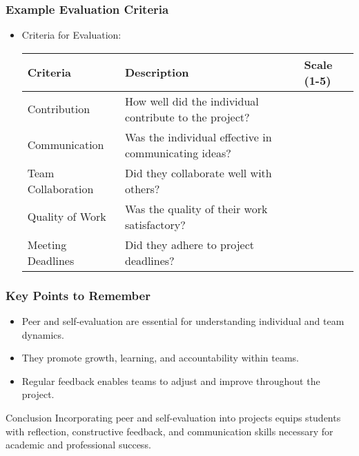 \documentclass{beamer}
\begin{document}
\begin{frame}[fragile]
    \frametitle{Example Evaluation Criteria}
    
    \begin{itemize}
        \item Criteria for Evaluation:
        \begin{tabular}{|l|l|l|}
            \hline
            \textbf{Criteria} & \textbf{Description} & \textbf{Scale (1-5)} \\
            \hline
            Contribution & How well did the individual contribute to the project? &  \\
            \hline
            Communication & Was the individual effective in communicating ideas? &  \\
            \hline
            Team Collaboration & Did they collaborate well with others? &  \\
            \hline
            Quality of Work & Was the quality of their work satisfactory? &  \\
            \hline
            Meeting Deadlines & Did they adhere to project deadlines? &  \\
            \hline
        \end{tabular}
    \end{itemize}
\end{frame}

\begin{frame}[fragile]
    \frametitle{Key Points to Remember}
    
    \begin{itemize}
        \item Peer and self-evaluation are essential for understanding individual and team dynamics.
        \item They promote growth, learning, and accountability within teams.
        \item Regular feedback enables teams to adjust and improve throughout the project.
    \end{itemize}
    
    \begin{block}{Conclusion}
        Incorporating peer and self-evaluation into projects equips students with reflection, constructive feedback, and communication skills necessary for academic and professional success.
    \end{block}
\end{frame}
\end{document}
